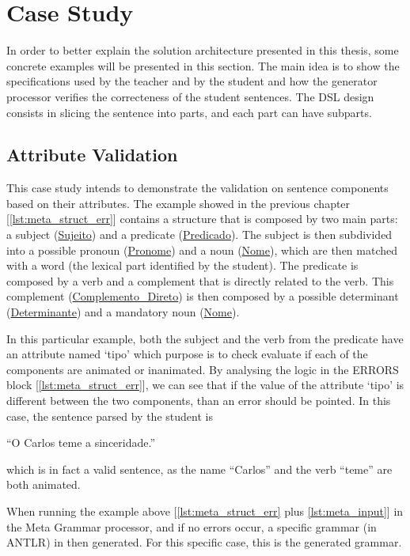 \chapter{Case Study} \label{case_study}
In order to better explain the solution architecture presented in this thesis, some concrete examples will be presented in this section. The main idea is to show the 
specifications used by the teacher and by the student and how the generator processor verifies the correcteness of the student sentences. The DSL design consists in 
slicing the sentence into parts, and each part can have subparts.

\section{Attribute Validation}
This case study intends to demonstrate the validation on sentence components based on their attributes. The example showed in the previous chapter 
[\ref{lst:meta_struct_err}] contains a structure that is composed by two main parts: a subject (\underline{Sujeito}) and a predicate (\underline{Predicado}). 
The subject is then subdivided into a possible pronoun (\underline{Pronome}) and a noun (\underline{Nome}), which are then matched with a word 
(the lexical part identified by the student). The predicate is composed by a verb and a complement that is directly related to the verb. This complement 
(\underline{Complemento\_Direto}) is then composed by a possible determinant (\underline{Determinante}) and a mandatory noun (\underline{Nome}).

In this particular example, both the subject and the verb from the predicate have an attribute named ‘tipo’ which purpose is to check evaluate if each of the components
are animated or inanimated. By analysing the logic in the ERRORS block [\ref{lst:meta_struct_err}], we can see that if the value of the attribute ‘tipo’ is different 
between the two components, than an error should be pointed. In this case, the sentence parsed by the student is

``O Carlos teme a sinceridade.''

\noindent which is in fact a valid sentence, as the name ``Carlos'' and the verb ``teme'' are both animated.

When running the example above [\ref{lst:meta_struct_err} plus \ref{lst:meta_input}] in the Meta Grammar processor, and if no errors occur, a specific grammar (in ANTLR) 
in then generated. For this specific case, this is the generated grammar.

